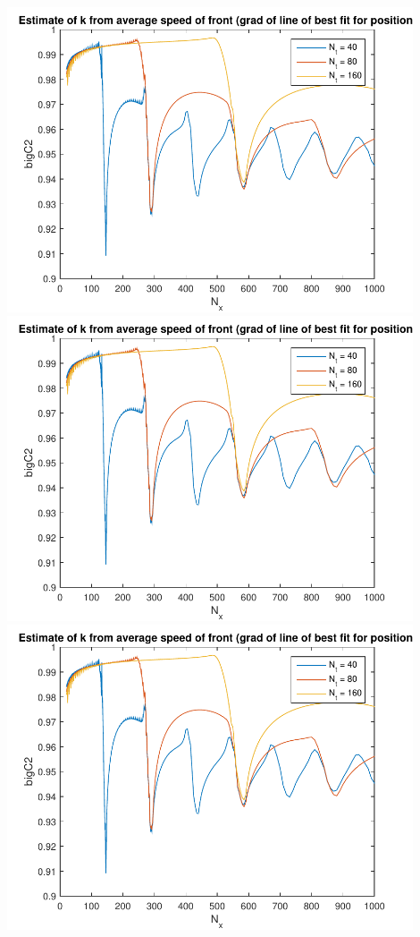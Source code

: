 \documentclass{article}
\begin{document}
\includegraphics[width=0.9\textwidth]{alan0-k.pdf}\\
\includegraphics[width=0.9\textwidth]{alan1-k.pdf}\\
\includegraphics[width=0.9\textwidth]{alan2-k.pdf}\\
\end{document}
